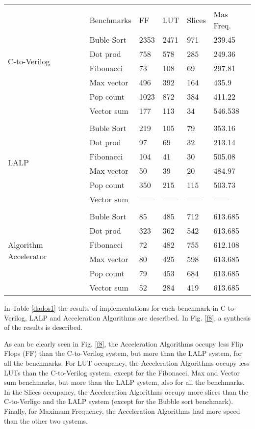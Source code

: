 \documentclass[preprint,12pt]{elsarticle}
\begin{document}
\begin{table*}[h]
\begin{center}
\tiny
\caption{The results of implementation for Benchmarks \label{dados1}}
\begin{tabular}{|l|l|l|l|l|l|} \hline
\multirow{8}{*}{C-to-Verilog} & & & & & \\
& Benchmarks & FF & LUT & Slices & Mas Freq.\\ \hline
& Buble Sort & 2353 & 2471 & 971 & 239.45\\
& Dot prod & 758 & 578 &285 & 249.36\\
& Fibonacci & 73 & 108 &69 & 297.81\\
& Max vector & 496 & 392 & 164 & 435.9\\
& Pop count & 1023 & 872 & 384 & 411.22\\
& Vector sum & 177 & 113 & 34 & 546.538\\ \hline
\multirow{7}{*}{LALP} &&&&& \\
&Buble Sort&219&105&79&353.16\\
&Dot prod&97&69&32&213.14\\
&Fibonacci&104&41&30&505.08\\
&Max vector&50&39&20&484.97\\
&Pop count&350&215&115&503.73\\
&Vector sum&------&------&------&------\\ \hline
\multirow{7}{*}{Algorithm Accelerator} &&&&&\\
&Buble Sort&85&485&712&613.685\\
&Dot prod&323&362&542&613.685\\
&Fibonacci&72&482&755&612.108\\
&Max vector&80&425&598&613.685\\
&Pop count&79&453&684&613.685\\
&Vector sum&52&284&419&613.685\\ \hline
\end{tabular}
\end{center}
\end{table*}




In Table \ref{dados1}  the results of implementations for each benchmark in C-to-Verilog, LALP and Acceleration Algorithms are described. In Fig. \ref{f8}, a synthesis of the results is described.

As can be clearly seen in Fig. \ref{f8}, the Acceleration Algorithms occupy less Flip Flops (FF) than the C-to-Verilog system, but more than the LALP system, for all the benchmarks. For LUT occupancy, the Acceleration Algorithms occupy less LUTs than the C-to-Verilog system, except for the Fibonacci, Max and Vector sum benchmarks, but more than the LALP system, also for all the benchmarks. In the Slices occupancy, the Acceleration Algorithms occupy more slices than the C-to-Verligo and the LALP system (except for the Bubble sort benchmark). Finally, for Maximum Frequency, the Acceleration Algorithms had more speed than the other two systems.
\end{document}

